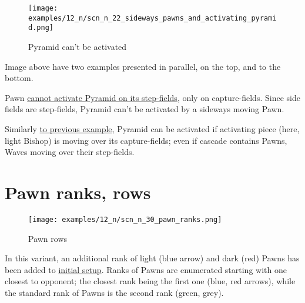 \vspace*{-1.4\baselineskip}
\noindent
\begin{figure}[!h]
\texttt{[image: examples/12\_n/scn\_n\_22\_sideways\_pawns\_and\_activating\_pyramid.png]}
\vspace*{-1.3\baselineskip}
\caption{Pyramid can't be activated}
\label{fig:scn_n_22_sideways_pawns_and_activating_pyramid}
\end{figure}

\vspace*{-0.5\baselineskip}
Image above have two examples presented in parallel, on the top, and to the bottom.

Pawn
\hyperref[fig:scn_mv_009_not_activating_pyramid_by_wave]{cannot activate Pyramid on its step-fields},
only on capture-fields. Since side fields are step-fields, Pyramid can't be
activated by a sideways moving Pawn.

Similarly
\hyperref[fig:scn_mv_010_activating_pyramid_cascade_pawn]{to previous example},
Pyramid can be activated if activating piece (here, light Bishop) is moving over
its capture-fields; even if cascade contains Pawns, Waves moving over their
step-fields.

\clearpage %

\section*{Pawn ranks, rows}
\label{sec:Nineteen/Pawn ranks, rows}

\vspace*{-1.1\baselineskip}
\noindent
\begin{figure}[!h]
\texttt{[image: examples/12\_n/scn\_n\_30\_pawn\_ranks.png]}
\caption{Pawn rows}
\label{fig:scn_n_30_pawn_ranks}
\end{figure}

In this variant, an additional rank of light (blue arrow) and dark (red) Pawns has
been added to \hyperref[fig:12_nineteen]{initial setup}. Ranks of Pawns are enumerated
starting with one closest to opponent; the closest rank being the first one (blue,
red arrows), while the standard rank of Pawns is the second rank (green, grey).

